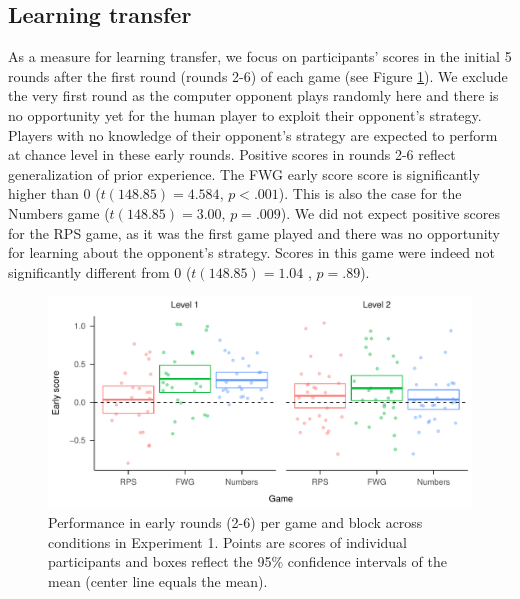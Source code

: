 \documentclass[smallextended]{svjour3}       %
\begin{document}
\hypertarget{learning-transfer}{%
\subsection{Learning transfer}\label{learning-transfer}}

As a measure for learning transfer, we focus on participants' scores in
the initial 5 rounds after the first round (rounds 2-6) of each game
(see Figure \ref{fig:exp1-early-score-by-opp}). We exclude the very
first round as the computer opponent plays randomly here and there is no
opportunity yet for the human player to exploit their opponent's
strategy. Players with no knowledge of their opponent's strategy are
expected to perform at chance level in these early rounds. Positive
scores in rounds 2-6 reflect generalization of prior experience. The FWG
early score score is significantly higher than 0 (\(t(148.85) = 4.584\),
\(p < .001\)). This is also the case for the Numbers game
(\(t(148.85) = 3.00\), \(p = .009\)). We did not expect positive scores
for the RPS game, as it was the first game played and there was no
opportunity for learning about the opponent's strategy. Scores in this
game were indeed not significantly different from 0
(\(t(148.85) = 1.04\) , \(p = .89\)).

\begin{figure}

{\centering \includegraphics[width=\textwidth]{CBB_v2_files/figure-latex/exp1-early-score-by-opp-1} 

}

\caption{\label{ref:figure4-caption}Performance in early rounds (2-6) per game and block across conditions in Experiment 1. Points are scores of individual participants and boxes reflect the 95\% confidence intervals of the mean (center line equals the mean).}\label{fig:exp1-early-score-by-opp}
\end{figure}
\end{document}
